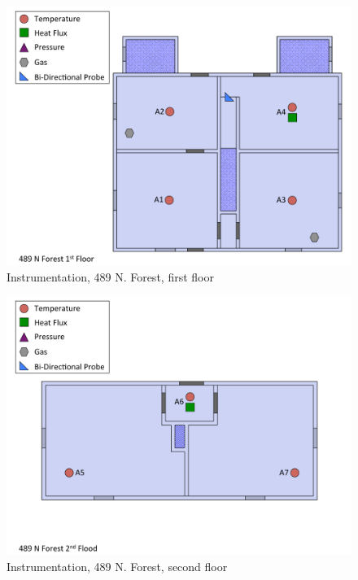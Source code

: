 \documentclass[12pt,oneside]{book}
\begin{document}
\begin{figure}[!ht]
\includegraphics[width=6in]{../Figures/Instrumentation/489_N_Forest_1st_Floor}
\caption{Instrumentation, 489 N. Forest, first floor}
\label{fig:Instrumentation_489_N_Forest_1st_Floor}
\end{figure}

\begin{figure}[!ht]
\includegraphics[width=6in]{../Figures/Instrumentation/489_N_Forest_2nd_Floor}
\caption{Instrumentation, 489 N. Forest, second floor}
\label{fig:Instrumentation_489_N_Forest_2nd_Floor}
\end{figure}
\end{document}
